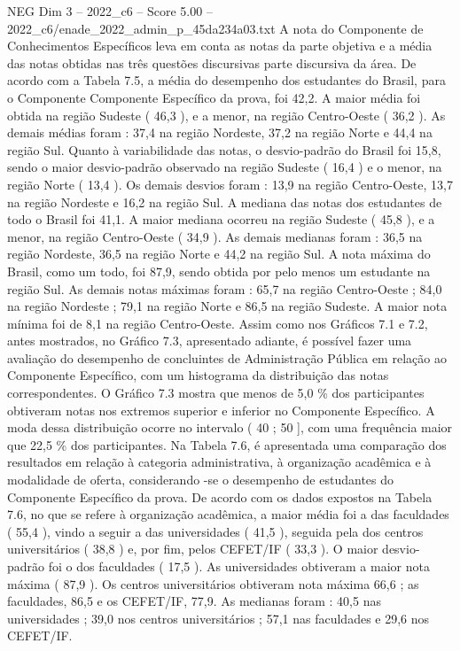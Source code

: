 \begin{textsample}{NEG Dim 3 – 2022\_c6 – Score 5.00 – 2022\_c6/enade\_2022\_admin\_p\_45da234a03.txt}
A nota do Componente de Conhecimentos Específicos leva em conta as notas da parte objetiva e a média das notas obtidas nas três questões discursivas parte discursiva da área.
De acordo com a Tabela 7.5, a média do desempenho dos estudantes do Brasil, para o Componente Componente Específico da prova, foi 42,2.
A maior média foi obtida na região Sudeste ( 46,3 ), e a menor, na região Centro-Oeste ( 36,2 ).
As demais médias foram : 37,4 na região Nordeste, 37,2 na região Norte e 44,4 na região Sul.
Quanto à variabilidade das notas, o desvio-padrão do Brasil foi 15,8, sendo o maior desvio-padrão observado na região Sudeste ( 16,4 ) e o menor, na região Norte ( 13,4 ).
Os demais desvios foram : 13,9 na região Centro-Oeste, 13,7 na região Nordeste e 16,2 na região Sul.
A mediana das notas dos estudantes de todo o Brasil foi 41,1.
A maior mediana ocorreu na região Sudeste ( 45,8 ), e a menor, na região Centro-Oeste ( 34,9 ).
As demais medianas foram : 36,5 na região Nordeste, 36,5 na região Norte e 44,2 na região Sul.
A nota máxima do Brasil, como um todo, foi 87,9, sendo obtida por pelo menos um estudante na região Sul.
As demais notas máximas foram : 65,7 na região Centro-Oeste ; 84,0 na região Nordeste ; 79,1 na região Norte e 86,5 na região Sudeste.
A maior nota mínima foi de 8,1 na região Centro-Oeste.
Assim como nos Gráficos 7.1 e 7.2, antes mostrados, no Gráfico 7.3, apresentado adiante, é possível fazer uma avaliação do desempenho de concluintes de Administração Pública em relação ao Componente Específico, com um histograma da distribuição das notas correspondentes.
O Gráfico 7.3 mostra que menos de 5,0 \% dos participantes obtiveram notas nos extremos superior e inferior no Componente Específico.
A moda dessa distribuição ocorre no intervalo ( 40 ; 50 ], com uma frequência maior que 22,5 \% dos participantes.
Na Tabela 7.6, é apresentada uma comparação dos resultados em relação à categoria administrativa, à organização acadêmica e à modalidade de oferta, considerando -se o desempenho de estudantes do Componente Específico da prova.
De acordo com os dados expostos na Tabela 7.6, no que se refere à organização acadêmica, a maior média foi a das faculdades ( 55,4 ), vindo a seguir a das universidades ( 41,5 ), seguida pela dos centros universitários ( 38,8 ) e, por fim, pelos CEFET/IF ( 33,3 ).
O maior desvio-padrão foi o dos faculdades ( 17,5 ).
As universidades obtiveram a maior nota máxima ( 87,9 ).
Os centros universitários obtiveram nota máxima 66,6 ; as faculdades, 86,5 e os CEFET/IF, 77,9.
As medianas foram : 40,5 nas universidades ; 39,0 nos centros universitários ; 57,1 nas faculdades e 29,6 nos CEFET/IF.

\end{textsample}
